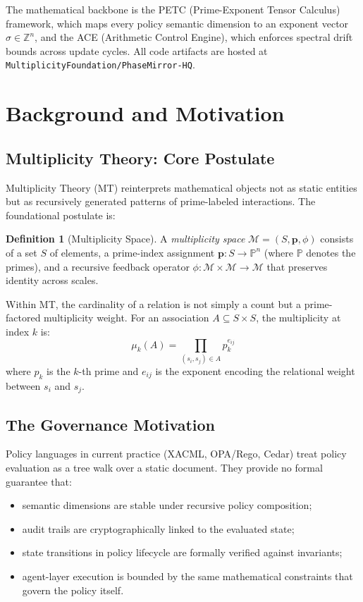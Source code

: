 \documentclass[12pt,letterpaper]{article}
\theoremstyle{definition}
\newtheorem{definition}{Definition}[section]
\theoremstyle{remark}
\begin{document}
The mathematical backbone is the PETC (Prime-Exponent Tensor Calculus) framework,
which maps every policy semantic dimension to an exponent vector \(\sigma \in
\mathbb{Z}^n\), and the ACE (Arithmetic Control Engine), which enforces spectral drift
bounds across update cycles. All code artifacts are hosted at \texttt{MultiplicityFoundation/PhaseMirror-HQ}.

\newpage

\section{Background and Motivation}

\subsection{Multiplicity Theory: Core Postulate}

Multiplicity Theory (MT) reinterprets mathematical objects not as static entities but
as recursively generated patterns of prime-labeled interactions. The foundational
postulate is:

\begin{definition}[Multiplicity Space]
A \emph{multiplicity space} \(\mathcal{M} = (S, \mathbf{p}, \phi)\) consists of a set
\(S\) of elements, a prime-index assignment \(\mathbf{p}: S \to \mathbb{P}^n\) (where
\(\mathbb{P}\) denotes the primes), and a recursive feedback operator
\(\phi: \mathcal{M} \times \mathcal{M} \to \mathcal{M}\) that preserves identity across
scales.
\end{definition}

Within MT, the cardinality of a relation is not simply a count but a prime-factored
multiplicity weight. For an association \(A \subseteq S \times S\), the multiplicity
at index \(k\) is:
\[
  \mu_k(A) = \prod_{(s_i, s_j) \in A} p_k^{e_{ij}} \tag{1}
\]
where \(p_k\) is the \(k\)-th prime and \(e_{ij}\) is the exponent encoding the
relational weight between \(s_i\) and \(s_j\).

\subsection{The Governance Motivation}

Policy languages in current practice (XACML, OPA/Rego, Cedar) treat policy evaluation
as a tree walk over a static document. They provide no formal guarantee that:
\begin{itemize}
  \item semantic dimensions are stable under recursive policy composition;
  \item audit trails are cryptographically linked to the evaluated state;
  \item state transitions in policy lifecycle are formally verified against invariants;
  \item agent-layer execution is bounded by the same mathematical constraints that
        govern the policy itself.
\end{itemize}
\end{document}
